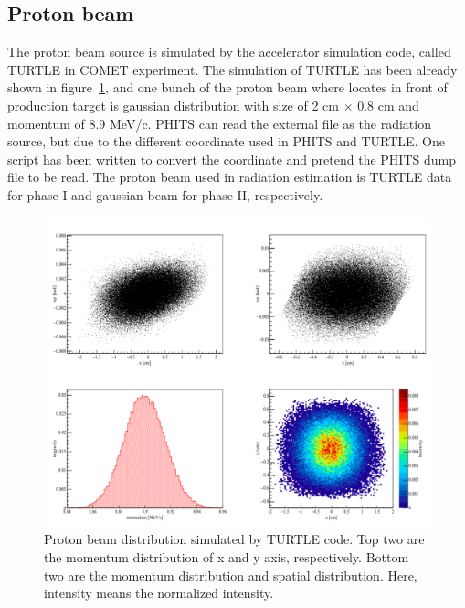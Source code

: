  \subsection{Proton beam}
The proton beam source is simulated by the accelerator simulation code, called TURTLE in COMET experiment.
The simulation of TURTLE has been already shown in figure~\ref{beam}, and one bunch of the proton beam where locates in front of production target is gaussian distribution with size of 2 cm $\times$ 0.8 cm and momentum of 8.9 MeV/c.
PHITS can read the external file as the radiation source, but due to the different coordinate used in PHITS and TURTLE.
One script has been written to convert the coordinate and pretend the PHITS dump file to be read. 
The proton beam used in radiation estimation is TURTLE data for phase-I and gaussian beam for phase-II, respectively.
\begin{figure}[H]
 \centering
 \includegraphics[scale=0.40]{chapter3/fig/beam.pdf}
 \caption{Proton beam distribution simulated by TURTLE code. Top two are the momentum distribution of x and y axis, respectively. Bottom two are the momentum distribution and spatial distribution. Here, intensity means the normalized intensity.}
 \label{beam}
\end{figure}
 
